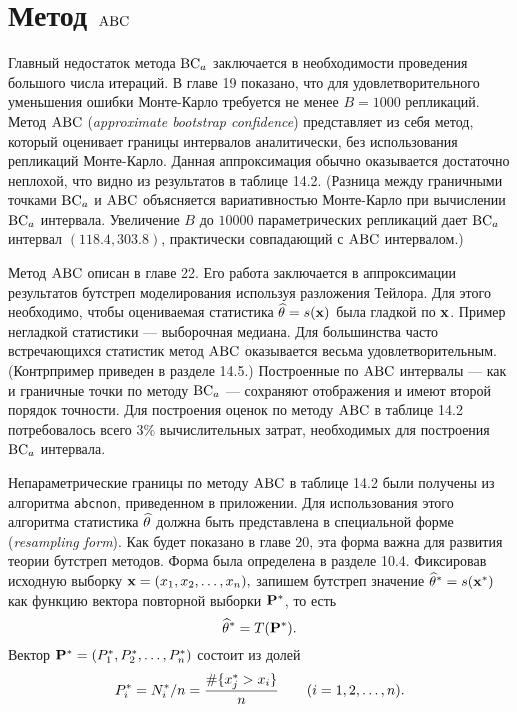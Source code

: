 \section{Метод $\mathrm{ABC}$}
Главный недостаток метода $\mathrm{BC}_a$ заключается в необходимости проведения большого числа итераций. В главе 19 показано, что для удовлетворительного уменьшения ошибки Монте-Карло требуется не менее $B = 1000$ репликаций. Метод $\mathrm{ABC}$ (\textit{approximate bootstrap confidence}) представляет из себя метод, который оценивает границы интервалов аналитически, без использования репликаций Монте-Карло. Данная аппроксимация обычно оказывается достаточно неплохой, что видно из результатов в таблице 14.2. (Разница между граничными точками $\mathrm{BC}_a$ и $\mathrm{ABC}$ объясняется вариативностью Монте-Карло при вычислении $\mathrm{BC}_a$ интервала. Увеличение $B$ до $10000$ параметрических репликаций дает $\mathrm{BC}_a$ интервал $(118.4,303.8)$, практически совпадающий с $\mathrm{ABC}$ интервалом.)

Метод $\mathrm{ABC}$ описан в главе 22. Его работа заключается в аппроксимации результатов бутстреп моделирования используя разложения Тейлора.  Для этого необходимо, чтобы оцениваемая статистика $\widehat{\theta} = s(\mathbf x)$ была гладкой по $\mathbf x$. Пример негладкой статистики --- выборочная медиана. Для большинства часто встречающихся статистик метод $\mathrm{ABC}$ оказывается весьма удовлетворительным. (Контрпример приведен в разделе 14.5.) Построенные по $\mathrm{ABC}$ интервалы --- как и граничные точки по методу $\mathrm{BC}_a$  --- сохраняют отображения и имеют второй порядок точности. Для построения оценок по методу $\mathrm{ABC}$ в таблице 14.2 потребовалось всего $3\%$  вычислительных затрат, необходимых для построения $\mathrm{BC}_a$ интервала.

Непараметрические границы по методу $\mathrm{ABC}$ в таблице 14.2 были получены из алгоритма \texttt{abcnon}, приведенном в приложении. Для использования этого алгоритма статистика $\widehat{\theta}$ должна быть представлена в специальной форме (\textit{resampling form}). Как будет показано в главе 20, эта форма важна для развития теории бутстреп методов. Форма была определена в разделе 10.4. Фиксировав исходную выборку $\mathbf x = (x_1,x_2,\ldots,x_{n}),$ запишем бутстреп значение $\widehat{\theta}^* = s(\mathbf x^*)$ как функцию вектора повторной выборки $\mathbf P^*$, то есть
\begin{equation}
  \widehat{\theta}^* = T(\mathbf P^*).
\end{equation}
Вектор $\mathbf P^* = (P_1^*, P_2^*, \ldots, P_n^*)$ состоит из долей
\begin{equation}
  P_i^* = N_i^*/n = \frac{\#\{x_j^*> x_i\}}{n} \qquad (i = 1,2,\ldots,n).
\end{equation}

